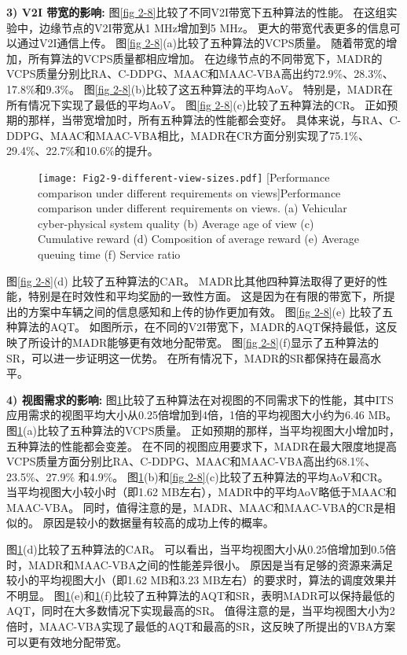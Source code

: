 \textbf{3) V2I 带宽的影响:}
图\ref{fig 2-8}比较了不同V2I带宽下五种算法的性能。
在这组实验中，边缘节点的V2I带宽从1 MHz增加到5 MHz。
更大的带宽代表更多的信息可以通过V2I通信上传。
图\ref{fig 2-8}(a)比较了五种算法的VCPS质量。
随着带宽的增加，所有算法的VCPS质量都相应增加。
在边缘节点的不同带宽下，MADR的VCPS质量分别比RA、C-DDPG、MAAC和MAAC-VBA高出约72.9\%、28.3\%、17.8\%和9.3\%。
图\ref{fig 2-8}(b)比较了这五种算法的平均AoV。
特别是，MADR在所有情况下实现了最低的平均AoV。
图\ref{fig 2-8}(c)比较了五种算法的CR。
正如预期的那样，当带宽增加时，所有五种算法的性能都会变好。
具体来说，与RA、C-DDPG、MAAC和MAAC-VBA相比，MADR在CR方面分别实现了75.1\%、29.4\%、22.7\%和10.6\%的提升。


\begin{figure}[h]
  \centering
  \texttt{[image: Fig2-9-different-view-sizes.pdf]}
  [Performance comparison under different requirements on views]{Performance comparison under different requirements on views. (a) Vehicular cyber-physical system quality (b) Average age of view (c) Cumulative reward (d) Composition of average reward (e) Average queuing time (f) Service ratio}
  \label{fig 2-9}
\end{figure}

图\ref{fig 2-8}(d) 比较了五种算法的CAR。
MADR比其他四种算法取得了更好的性能，特别是在时效性和平均奖励的一致性方面。
这是因为在有限的带宽下，所提出的方案中车辆之间的信息感知和上传的协作更加有效。
图\ref{fig 2-8}(e) 比较了五种算法的AQT。
如图所示，在不同的V2I带宽下，MADR的AQT保持最低，这反映了所设计的MADR能够更有效地分配带宽。
图\ref{fig 2-8}(f)显示了五种算法的SR，可以进一步证明这一优势。
在所有情况下，MADR的SR都保持在最高水平。

\textbf{4) 视图需求的影响:}
图\ref{fig 2-9}比较了五种算法在对视图的不同需求下的性能，其中ITS应用需求的视图平均大小从0.25倍增加到4倍，1倍的平均视图大小约为6.46 MB。
图\ref{fig 2-9}(a)比较了五种算法的VCPS质量。
正如预期的那样，当平均视图大小增加时，五种算法的性能都会变差。
在不同的视图应用要求下，MADR在最大限度地提高VCPS质量方面分别比RA、C-DDPG、MAAC和MAAC-VBA高出约68.1\%、23.5\%、27.9\% 和4.9\%。
图\ref{fig 2-9}(b)和\ref{fig 2-8}(c)比较了五种算法的平均AoV和CR。
当平均视图大小较小时（即1.62 MB左右），MADR中的平均AoV略低于MAAC和MAAC-VBA。
同时，值得注意的是，MADR、MAAC和MAAC-VBA的CR是相似的。
原因是较小的数据量有较高的成功上传的概率。

图\ref{fig 2-9}(d)比较了五种算法的CAR。
可以看出，当平均视图大小从0.25倍增加到0.5倍时，MADR和MAAC-VBA之间的性能差异很小。
原因是当有足够的资源来满足较小的平均视图大小（即1.62 MB和3.23 MB左右）的要求时，算法的调度效果并不明显。
图\ref{fig 2-9}(e)和\ref{fig 2-9}(f)比较了五种算法的AQT和SR，表明MADR可以保持最低的AQT，同时在大多数情况下实现最高的SR。
值得注意的是，当平均视图大小为2倍时，MAAC-VBA实现了最低的AQT和最高的SR，这反映了所提出的VBA方案可以更有效地分配带宽。

